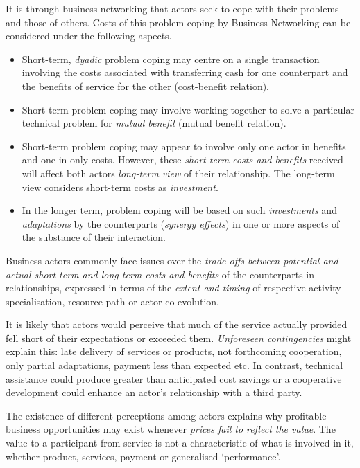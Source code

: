 \documentclass[11pt,a4paper]{article}
\begin{document}
It is through business networking that actors seek to cope with their problems
and those of others.  Costs of this problem coping by Business Networking can
be considered under the following aspects.
\begin{itemize}
\item Short-term, \emph{dyadic} problem coping may centre on a single
  transaction involving the costs associated with transferring cash for one
  counterpart and the beneﬁts of service for the other (cost-benefit
  relation).
\item Short-term problem coping may involve working together to solve a
  particular technical problem for \emph{mutual beneﬁt} (mutual benefit
  relation).
\item Short-term problem coping may appear to involve only one actor in
  beneﬁts and one in only costs. However, these \emph{short-term costs and
    beneﬁts} received will affect both actors \emph{long-term view} of their
  relationship.  The long-term view considers short-term costs as
  \emph{investment}.
\item In the longer term, problem coping will be based on such
  \emph{investments} and \emph{adaptations} by the counterparts (\emph{synergy
    effects}) in one or more aspects of the substance of their interaction.
\end{itemize}
Business actors commonly face issues over the \emph{trade-offs between
  potential and actual short-term and long-term costs and beneﬁts} of the
counterparts in relationships, expressed in terms of the \emph{extent and
  timing} of respective activity specialisation, resource path or actor
co-evolution.

It is likely that actors would perceive that much of the service actually
provided fell short of their expectations or exceeded them.  \emph{Unforeseen
  contingencies} might explain this: late delivery of services or products,
not forthcoming cooperation, only partial adaptations, payment less than
expected etc. In contrast, technical assistance could produce greater than
anticipated cost savings or a cooperative development could enhance an actor's
relationship with a third party.

The existence of different perceptions among actors explains why proﬁtable
business opportunities may exist whenever \emph{prices fail to reﬂect the
  value}.  The value to a participant from service is not a characteristic of
what is involved in it, whether product, services, payment or generalised
‘performance’.
\end{document}
